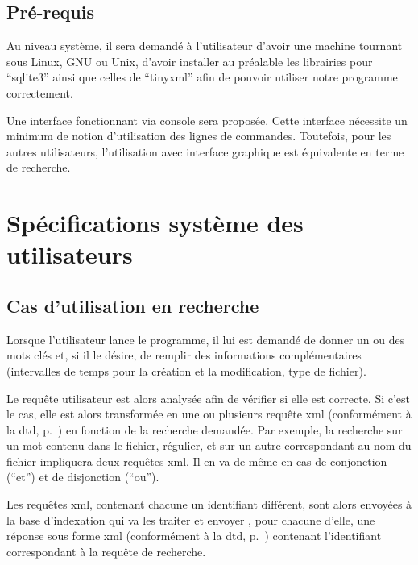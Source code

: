 \documentclass[a4paper,12pt]{report}
\begin{document}
\subsection{Pré-requis}
Au niveau système, il sera demandé à l'utilisateur d'avoir une machine tournant sous Linux, GNU ou Unix, d'avoir installer au préalable les librairies pour \enquote{sqlite3} ainsi que celles de \enquote{tinyxml} afin de pouvoir utiliser notre programme correctement.

Une interface fonctionnant via \gls{console} sera proposée. Cette interface nécessite un minimum de notion d'utilisation des lignes de commandes. Toutefois, pour les autres utilisateurs, l'utilisation avec interface graphique est équivalente en terme de recherche.

\section{Spécifications système des utilisateurs}

\subsection{Cas d'utilisation en recherche}
Lorsque l'utilisateur lance le programme, il lui est demandé de donner un ou des mots clés et, si il le désire, de remplir des informations complémentaires (intervalles de temps pour la création et la modification, type de \gls{fichier}).

Le requête utilisateur est alors analysée afin de vérifier si elle est correcte. Si c'est le cas, elle est alors transformée en une ou plusieurs requête \gls{xml} (conformément à la \gls{dtd}, p.~\pageref{dtd_bi_mr_search}) en fonction de la recherche demandée. Par exemple, la recherche sur un mot contenu dans le fichier, régulier, et sur un autre correspondant au nom du \gls{fichier} impliquera deux requêtes \gls{xml}. Il en va de même en cas de conjonction (\enquote{et}) et de disjonction (\enquote{ou}).

Les requêtes \gls{xml}, contenant chacune un identifiant différent, sont alors envoyées à la base d'indexation qui va les traiter et envoyer , pour chacune d'elle, une réponse sous forme \gls{xml} (conformément à la \gls{dtd}, p.~\pageref{dtd_bi_mr_result}) contenant l'identifiant correspondant à la requête de recherche.
\end{document}
